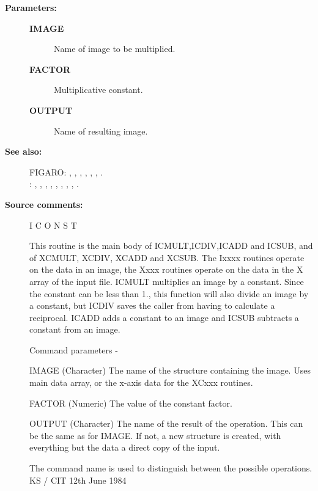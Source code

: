 \begin{description}
\begin{description}
\item [\textbf{Parameters:}]
\begin{description}
\item [\textbf{IMAGE}]
 Name of image to be multiplied.
\item [\textbf{FACTOR}]
 Multiplicative constant.
\item [\textbf{OUTPUT}]
 Name of resulting image.
\end{description}

\item [\textbf{See also:}]
FIGARO: , , , , , , .\\
: , , , , , , , , .\\

\item [\textbf{Source comments:}]
\begin{terminalv}
 I C O N S T

 This routine is the main body of ICMULT,ICDIV,ICADD and ICSUB,
 and of XCMULT, XCDIV, XCADD and XCSUB.  The Ixxxx routines
 operate on the data in an image, the Xxxx routines operate on
 the data in the X array of the input file.
 ICMULT multiplies an image by a constant.  Since the constant
 can be less than 1., this function will also divide an
 image by a constant, but ICDIV saves the caller from having
 to calculate a reciprocal. ICADD adds a constant to an image and
 ICSUB subtracts a constant from an image.

 Command parameters -

 IMAGE  (Character) The name of the structure containing the image.
        Uses main data array, or the x-axis data for the XCxxx routines.

 FACTOR (Numeric) The value of the constant factor.

 OUTPUT (Character) The name of the result of the operation.  This
        can be the same as for IMAGE.  If not, a new structure
        is created, with everything but the data a direct
        copy of the input.

 The command name is used to distinguish between the
 possible operations.
                                  KS / CIT 12th June 1984
\end{terminalv}
\end{description}

\end{description}
